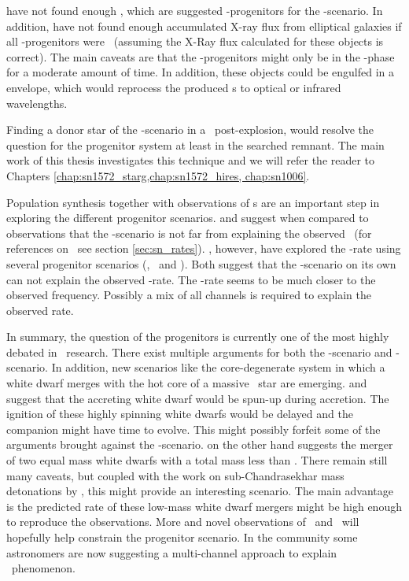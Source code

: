 \cite{2010ApJ...719..474D} have not found enough \sss, which are suggested \snia-progenitors for the \sd-scenario. In addition, \cite{2010Natur.463..924G} have not found enough accumulated X-ray flux from elliptical galaxies if all \snia-progenitors were \sss\ (assuming the X-Ray flux calculated for these objects is correct). The main caveats are that the \snia-progenitors might only be in the \sss-phase for a moderate amount of time. In addition, these objects could be engulfed in a envelope, which would reprocess the produced \xray s to optical or infrared wavelengths.

Finding a donor star of the \sd-scenario in a \snr\ post-explosion, would resolve the question for the progenitor system at least in the searched remnant. The main work of this thesis investigates this technique and we will refer the reader to Chapters \ref{chap:sn1572_starg,chap:sn1572_hires, chap:sn1006}. 

Population synthesis together with observations of \dtd s are an important step in exploring the different progenitor scenarios. \citet{2008ApJ...683L.127H, Han:2004p444}  and suggest when compared to observations that the \sd-scenario is not far from explaining the observed \dtd\ (for references on \dtd\ see section \ref{sec:sn_rates}). 
\citet{2009ApJ...699.2026R, 2010A&A...515A..89M}, however, have explored the \snia-rate using several progenitor scenarios (\sd, \dd\ and \amcvn). Both suggest that the \sd-scenario on its own can not explain the observed \sneia-rate. The \dd-rate seems to be much closer to the observed frequency. Possibly a mix of all channels is required to explain the observed rate. 

In summary, the question of the progenitors is currently one of the most highly debated in \sneia\ research. There exist multiple arguments for both the \sd-scenario and \dd-scenario. In addition, new scenarios like the core-degenerate system in which a white dwarf merges with the hot core of a massive \agb\ star \cite{2011arXiv1106.2027I} are emerging. \cite{2011arXiv1102.4342D} and \citet{2011ApJ...730L..34J} suggest that the accreting white dwarf would be spun-up during accretion. The ignition of these highly spinning white dwarfs would be delayed and the companion might have time to evolve. This might possibly forfeit some of the arguments brought against the \sd-scenario. 
\cite{2010ApJ...722L.157V} on the other hand suggests the merger of two equal mass white dwarfs with a total mass less than \mchan. There remain still many caveats, but coupled with the work on sub-Chandrasekhar mass detonations by \citet{2010ApJ...714L..52S}, this might provide an interesting scenario. The main advantage is the predicted rate of these low-mass white dwarf mergers might be high enough to reproduce the observations.
More and novel observations of \sneia\ and \snr\ will hopefully help constrain the progenitor scenario. In the community some astronomers are now suggesting a multi-channel approach to explain \sneia\ phenomenon.
 

